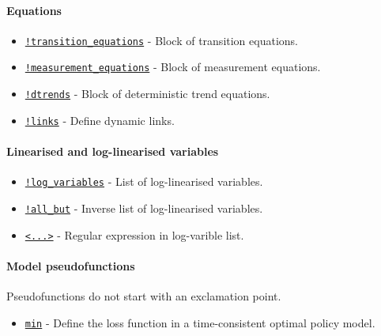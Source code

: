 \paragraph{Equations}\label{equations}

\begin{itemize}
\itemsep1pt\parskip0pt
\item
  \href{modellang/transitionequations}{\texttt{!transition\_equations}}
  - Block of transition equations.
\item
  \href{modellang/measurementequations}{\texttt{!measurement\_equations}}
  - Block of measurement equations.
\item
  \href{modellang/dtrends}{\texttt{!dtrends}} - Block of deterministic
  trend equations.
\item
  \href{modellang/links}{\texttt{!links}} - Define dynamic links.
\end{itemize}

\paragraph{Linearised and log-linearised
variables}\label{linearised-and-log-linearised-variables}

\begin{itemize}
\itemsep1pt\parskip0pt
\item
  \href{modellang/logvariables}{\texttt{!log\_variables}} - List of
  log-linearised variables.
\item
  \href{modellang/allbut}{\texttt{!all\_but}} - Inverse list of
  log-linearised variables.
\item
  \href{modellang/regexpression}{\texttt{\textless{}...\textgreater{}}}
  - Regular expression in log-varible list.
\end{itemize}

\paragraph{Model pseudofunctions}\label{model-pseudofunctions}

Pseudofunctions do not start with an exclamation point.

\begin{itemize}
\itemsep1pt\parskip0pt
\item
  \href{modellang/min}{\texttt{min}} - Define the loss function in a
  time-consistent optimal policy model.
\end{itemize}

